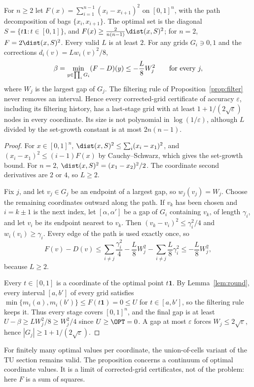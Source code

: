 \begin{proposition}\label{lim:prop:setgrowth}
For $n\ge2$ let $F(x)=\sum_{i=1}^{n-1}(x_i-x_{i+1})^2$ on $[0,1]^n$, with
the path decomposition of bags $\{x_i,x_{i+1}\}$. The optimal set is the
diagonal $S=\{t\mathbf1:t\in[0,1]\}$, and
$F(x)\ge\frac2{n(n-1)}\dist(x,S)^2$; for $n=2$, $F=2\dist(x,S)^2$. Every
valid $L$ is at least $2$. For any grids $G_i\ni0,1$ and the corrections
$d_i(v)=Lw_i(v)^2/8$,
\[
\beta=\min_{y\in\prod_iG_i}(F-D)(y)\le-\frac L8W_j^2
\qquad\hbox{for every }j,
\]
where $W_j$ is the largest gap of $G_j$. The filtering rule of
Proposition~\ref{prop:filter} never removes an interval. Hence every
corrected-grid certificate of accuracy $\varepsilon$, including its
filtering history, has a last-stage grid with at least
$1+1/(2\sqrt\varepsilon)$ nodes in every coordinate. Its size is not
polynomial in $\log(1/\varepsilon)$, although $L$ divided by the set-growth
constant is at most $2n(n-1)$.
\end{proposition}

\begin{proof}
For $x\in[0,1]^n$, $\dist(x,S)^2\le\sum_i(x_i-x_1)^2$, and
$(x_i-x_1)^2\le(i-1)F(x)$ by Cauchy--Schwarz, which gives the set-growth
bound. For $n=2$, $\dist(x,S)^2=(x_1-x_2)^2/2$. The coordinate second
derivatives are $2$ or $4$, so $L\ge2$.

Fix $j$, and let $v_j\in G_j$ be an endpoint of a largest gap, so
$w_j(v_j)=W_j$. Choose the remaining coordinates outward along the path. If
$v_k$ has been chosen and $i=k\pm1$ is the next index, let $[\alpha,\alpha']$
be a gap of $G_i$ containing $v_k$, of length $\gamma_i$, and let $v_i$ be
its endpoint nearest to $v_k$. Then $(v_k-v_i)^2\le\gamma_i^2/4$ and
$w_i(v_i)\ge\gamma_i$. Every edge of the path is used exactly once, so
\[
F(v)-D(v)\le\sum_{i\ne j}\frac{\gamma_i^2}4-\frac L8W_j^2
-\sum_{i\ne j}\frac L8\gamma_i^2\le-\frac L8W_j^2,
\]
because $L\ge2$.

Every $t\in[0,1]$ is a coordinate of the optimal point $t\mathbf1$. By
Lemma~\ref{lem:round}, every interval $[a,b']$ of every grid satisfies
$\min\{m_i(a),m_i(b')\}\le F(t\mathbf1)=0\le U$ for $t\in[a,b']$, so the
filtering rule keeps it. Thus every stage covers $[0,1]^n$, and the final
gap is at least $U-\beta\ge LW_j^2/8\ge W_j^2/4$ since $U\ge\OPT=0$. A gap
at most $\varepsilon$ forces $W_j\le2\sqrt\varepsilon$, hence
$|G_j|\ge1+1/(2\sqrt\varepsilon)$.
\end{proof}

For finitely many optimal values per coordinate, the union-of-cells variant
of the TU section remains valid. The proposition concerns a continuum of
optimal coordinate values. It is a limit of corrected-grid certificates, not
of the problem: here $F$ is a sum of squares.

